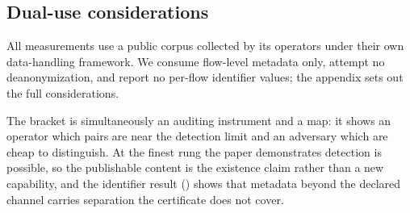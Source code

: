 \subsection{Dual-use considerations}
\label{sec:discussion/ethics}

All measurements use a public corpus collected by its operators under their own
data-handling framework. We consume flow-level metadata only, attempt no
deanonymization, and report no per-flow identifier values; the appendix sets out
the full considerations.

The bracket is simultaneously an auditing instrument and a map: it shows an
operator which pairs are near the detection limit and an adversary which are
cheap to distinguish. At the finest rung the paper demonstrates detection is
possible, so the publishable content is the existence claim rather than a new
capability, and the identifier result () shows
that metadata beyond the declared channel carries separation the certificate does
not cover.



